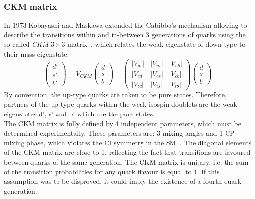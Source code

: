 \subsubsection{CKM matrix}
\label{sec:ckm}
In 1973 Kobayashi and Maskawa extended the Cabibbo's mechanism allowing to describe the transitions within and in-between 3 generations of quarks
using the so-called \textit{CKM} $3\times3$ matrix~\cite{cabibbo,ckm}, which relates the weak eigenstate of down-type to their mass eigenstate:
\begin{equation}
	\begin{pmatrix}
	d' \\ 
	s' \\ 
	b' 
	\end{pmatrix} 
	= V_{CKM}
	\begin{pmatrix}
	d \\ 
	s \\ 
	b
	\end{pmatrix} 
	=
	\begin{pmatrix}
	|V_{ud}| & |V_{us}| & |V_{ub}| \\ 
	|V_{cd}| & |V_{cs}| & |V_{cb}| \\ 
	|V_{td}| & |V_{ts}|  &| V_{tb}|
	\end{pmatrix} 
	\begin{pmatrix}
	d \\ 
	s \\ 
	b
	\end{pmatrix} 
\end{equation}
By  convention, the up-type quarks are taken to be pure states.
Therefore, partners of the up-type quarks within the weak isospin doublets are the weak eigenstates d’, s’ and b’ which are the pure states. \\
The CKM matrix is fully defined by 4 independent parameters, which must be determined experimentally. These parameters are: 3 mixing angles and 1 CP-mixing
phase, which violates the CP\footnotemark symmetry in the SM~\cite{cp_vio}.
The diagonal elements of the CKM matrix are close to 1, reflecting the fact that transitions are favoured between quarks of the same generation. 
The CKM matrix is unitary, i.e. the sum of the transition probabilities for any quark flavour is equal to 1. If this assumption was to be disproved, 
it could imply the existence of a fourth quark generation.


